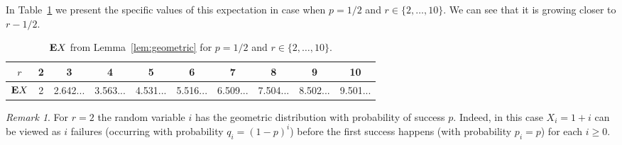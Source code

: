 \documentclass[12pt,reqno]{amsart}
\theoremstyle{remark}
\newtheorem{remark}{Remark}
\def\E{\mbox{{\bf E}}}
\def\E{\mbox{{\bf E}}}
\begin{document}
In Table~\ref{tab:EX} we present the specific values of this expectation in case when $p=1/2$ and $r\in\{2,\dots,10\}$. We can see that it is growing closer to $r-1/2$.

\begin{table}
\begin{tabular}{ |c|c c c c c c c c c| } 
 \hline
$r$ & 2 & 3& 4& 5& 6& 7& 8& 9& 10\\
 \hline
$\E X$  & 2 & 2.642... & 3.563...& 4.531...& 5.516...& 6.509...& 7.504...& 8.502...& 9.501...\\
\hline
\end{tabular}
\caption{$\E X$ from Lemma~\ref{lem:geometric} for $p=1/2$ and $r\in\{2,\dots,10\}$.}
\label{tab:EX}
\end{table}

\begin{remark}
For $r=2$ the random variable $i$ has the geometric distribution with probability of success $p$. Indeed, in this case $X_i=1+i$ can be viewed as $i$ failures (occurring with probability $q_i=(1-p)^i$) before the first success happens (with probability $p_i=p$) for each $i\ge 0$.
\end{remark}
\end{document}
